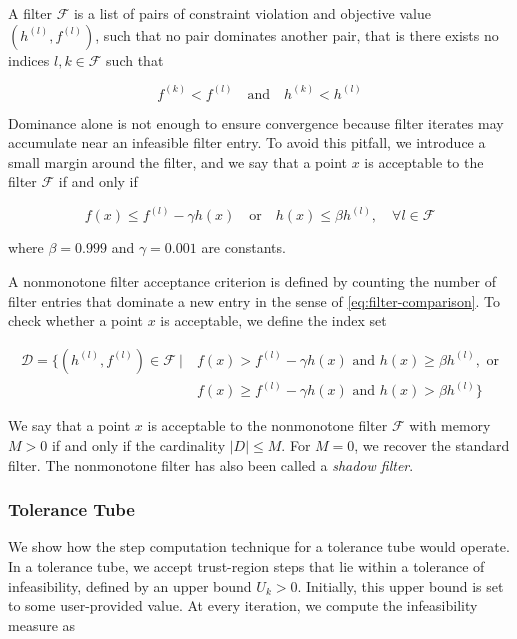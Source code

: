 A filter $\mathcal{F}$ is a list of pairs of constraint violation and objective value $(h^{(l)}, f^{(l)})$, such that no
pair dominates another pair, that is there exists no indices $l, k \in \mathcal{F}$ such that

\begin{equation}
f^{(k)} < f^{(l)} \quad \text{and} \quad h^{(k)} < h^{(l)}
\end{equation}

Dominance alone is not enough to ensure convergence because filter iterates may accumulate near an infeasible filter
entry. To avoid this pitfall, we introduce a small margin around the filter, and we say that a point $x$ is acceptable
to the filter $\mathcal{F}$ if and only if

\begin{equation}
f(x) \le f^{(l)} - \gamma h(x) \quad \text{or} \quad h(x) \le \beta h^{(l)}, \quad \forall l \in \mathcal{F}
\label{eq:filter-comparison}
\end{equation}

where $\beta = 0.999$ and $\gamma = 0.001$ are constants.

A nonmonotone filter acceptance criterion is defined by counting the number of filter entries that dominate a new entry
in the sense of \autoref{eq:filter-comparison}. To check whether a point $x$ is acceptable, we define the index set

\begin{equation}
\begin{aligned}
\mathcal{D} = \{ (h^{(l)}, f^{(l)}) \in \mathcal{F} ~|~ & f(x) > f^{(l)} - \gamma h(x) \text{ and } h(x) \ge \beta h^{(l)}, \text{ or} \\
										& f(x) \ge f^{(l)} - \gamma h(x) \text{ and } h(x) > \beta h^{(l)} \}
\end{aligned}
\end{equation}

We say that a point $x$ is acceptable to the nonmonotone filter $\mathcal{F}$ with memory $M > 0$ if and only if the
cardinality $|D| \le M$. For $M = 0$, we recover the standard filter. The nonmonotone filter has also been called a
\textit{shadow filter}.


\subsubsection{Tolerance Tube}

We show how the step computation technique for a tolerance tube would operate. In a tolerance tube,
we accept trust-region steps that lie within a tolerance of infeasibility, defined by an upper bound $U_k>0$.
Initially, this upper bound is set to some user-provided value. At every iteration, we compute the infeasibility
measure as

